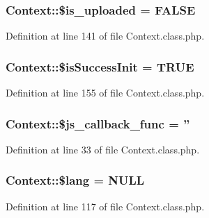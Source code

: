 \hypertarget{classContext_a4f8c544baae73ab83d08ec55e0c7c00d}{
\subsubsection[{\$is\+\_\+uploaded}]{\setlength{\rightskip}{0pt plus 5cm}Context\+::\$is\+\_\+uploaded = F\+A\+L\+S\+E}}\label{classContext_a4f8c544baae73ab83d08ec55e0c7c00d}


Definition at line 141 of file Context.\+class.\+php.

\hypertarget{classContext_a342fb7b74268197dea5cadbe62aaea7a}{
\subsubsection[{\$is\+Success\+Init}]{\setlength{\rightskip}{0pt plus 5cm}Context\+::\$is\+Success\+Init = T\+R\+U\+E}}\label{classContext_a342fb7b74268197dea5cadbe62aaea7a}


Definition at line 155 of file Context.\+class.\+php.

\hypertarget{classContext_afddd5e6374a20b88466dfd1cb6f32d62}{
\subsubsection[{\$js\+\_\+callback\+\_\+func}]{\setlength{\rightskip}{0pt plus 5cm}Context\+::\$js\+\_\+callback\+\_\+func = ''}}\label{classContext_afddd5e6374a20b88466dfd1cb6f32d62}


Definition at line 33 of file Context.\+class.\+php.

\hypertarget{classContext_a0771720dad655d0c53f6f31066c67a40}{
\subsubsection[{\$lang}]{\setlength{\rightskip}{0pt plus 5cm}Context\+::\$lang = N\+U\+L\+L}}\label{classContext_a0771720dad655d0c53f6f31066c67a40}


Definition at line 117 of file Context.\+class.\+php.


